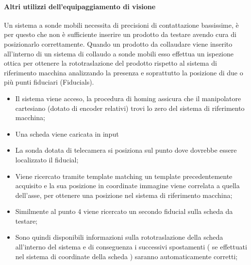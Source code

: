 \paragraph{Altri utilizzi dell'equipaggiamento di visione}
Un sistema a sonde mobili necessita di precisioni di contattazione bassissime, è per questo che non è
sufficiente inserire un prodotto da testare avendo cura di posizionarlo correttamente.
Quando un prodotto da collaudare viene inserito all'interno di un sistema di collaudo a sonde mobili esso effettua un ispezione ottica per ottenere la
rototraslazione del prodotto rispetto al sistema di riferimento macchina analizzando la presenza e
soprattutto la posizione di due o più punti fiduciari (Fiducials).

\begin{itemize}
\item Il sistema viene acceso, la procedura di homing assicura che il manipolatore cartesiano (dotato di
encoder relativi) trovi lo zero del sistema di riferimento macchina;
\item Una scheda viene caricata in input
\item La sonda dotata di telecamera si posiziona sul punto dove dovrebbe essere localizzato il fiducial;
\item Viene ricercato tramite template matching un template
precedentemente acquisito e la sua posizione in coordinate immagine viene correlata a quella
dell'asse, per ottenere una posizione nel sistema di riferimento macchina;
\item Similmente al punto 4 viene ricercato un secondo fiducial sulla scheda da testare;
\item Sono quindi disponibili informazioni sulla rototraslazione della scheda all'interno del sistema e di
conseguenza i successivi spostamenti ( se effettuati nel sistema di coordinate della scheda )
saranno automaticamente corretti;
\end{itemize}


